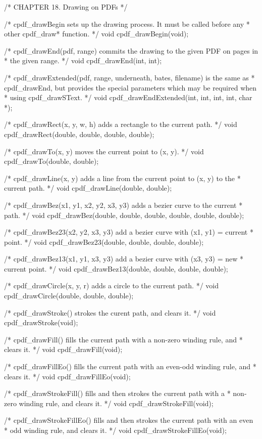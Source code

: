 /* CHAPTER 18. Drawing on PDFs */

/* cpdf_drawBegin sets up the drawing process. It must be called before any
 * other cpdf_draw* function. */
void cpdf_drawBegin(void);

/* cpdf_drawEnd(pdf, range) commits the drawing to the given PDF on pages in
 * the given range. */
void cpdf_drawEnd(int, int);

/* cpdf_drawExtended(pdf, range, underneath, bates, filename) is the same as
 * cpdf_drawEnd, but provides the special parameters which may be required when
 * using cpdf_drawSText. */
void cpdf_drawEndExtended(int, int, int, int, char *);

/* cpdf_drawRect(x, y, w, h) adds a rectangle to the current path. */
void cpdf_drawRect(double, double, double, double);

/* cpdf_drawTo(x, y) moves the current point to (x, y). */
void cpdf_drawTo(double, double);

/* cpdf_drawLine(x, y) adds a line from the current point to (x, y) to the
 * current path. */
void cpdf_drawLine(double, double);

/* cpdf_drawBez(x1, y1, x2, y2, x3, y3) adds a bezier curve to the current
 * path. */
void cpdf_drawBez(double, double, double, double, double, double);

/* cpdf_drawBez23(x2, y2, x3, y3) add a bezier curve with (x1, y1) = current
 * point. */
void cpdf_drawBez23(double, double, double, double);

/* cpdf_drawBez13(x1, y1, x3, y3) add a bezier curve with (x3, y3) = new
 * current point. */
void cpdf_drawBez13(double, double, double, double);

/* cpdf_drawCircle(x, y, r) adds a circle to the current path. */
void cpdf_drawCircle(double, double, double);

/* cpdf_drawStroke() strokes the curent path, and clears it. */
void cpdf_drawStroke(void);

/* cpdf_drawFill() fills the current path with a non-zero winding rule, and
 * clears it. */
void cpdf_drawFill(void);

/* cpdf_drawFillEo() fills the current path with an even-odd winding rule, and
 * clears it. */
void cpdf_drawFillEo(void);

/* cpdf_drawStrokeFill() fills and then strokes the current path with a
 * non-zero winding rule, and clears it. */
void cpdf_drawStrokeFill(void);

/* cpdf_drawStrokeFillEo() fills and then strokes the current path with an even
 * odd winding rule, and clears it. */
void cpdf_drawStrokeFillEo(void);

